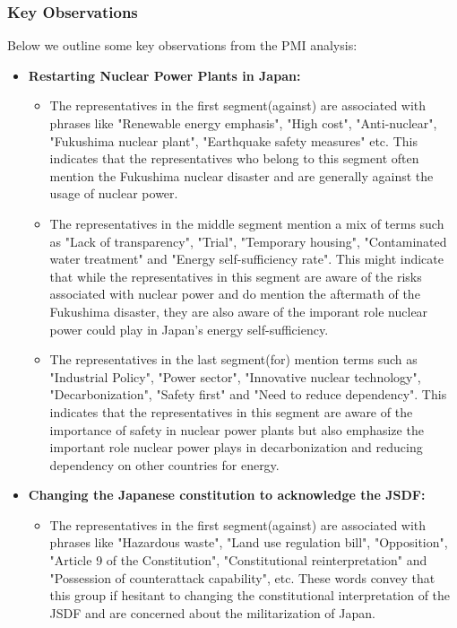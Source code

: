 \documentclass[final,5p,times,twocolumn,authoryear]{elsarticle}
\begin{document}
\subsubsection{Key Observations}
Below we outline some key observations from the PMI analysis:
\begin{itemize}
	\item \textbf{Restarting Nuclear Power Plants in Japan:}
		\begin{itemize}
			\item The representatives in the first segment(against) are associated with phrases like "Renewable energy emphasis", "High cost", "Anti-nuclear", "Fukushima nuclear plant", "Earthquake safety measures" etc. This indicates that the representatives who belong to this segment often mention the Fukushima nuclear disaster and are generally against the usage of nuclear power. 
			\item The representatives in the middle segment mention a mix of terms such as "Lack of transparency", "Trial", "Temporary housing", "Contaminated water treatment" and "Energy self-sufficiency rate". This might indicate that while the representatives in this segment are aware of the risks associated with nuclear power and do mention the aftermath of the Fukushima disaster, they are also aware of the imporant role nuclear power could play in Japan's energy self-sufficiency.
			\item The representatives in the last segment(for) mention terms such as "Industrial Policy", "Power sector", "Innovative nuclear technology", "Decarbonization", "Safety first" and "Need to reduce dependency". This indicates that the representatives in this segment are aware of the importance of safety in nuclear power plants but also emphasize the important role nuclear power plays in decarbonization and reducing dependency on other countries for energy.
		\end{itemize}
	\item \textbf{Changing the Japanese constitution to acknowledge the JSDF:}
		\begin{itemize}
			\item The representatives in the first segment(against) are associated with phrases like "Hazardous waste", "Land use regulation bill", "Opposition", "Article 9 of the Constitution", "Constitutional reinterpretation" and "Possession of counterattack capability", etc. These words convey that this group if hesitant to changing the constitutional interpretation of the JSDF and are concerned about the militarization of Japan.

\end{itemize}
\end{itemize}
\end{document}
